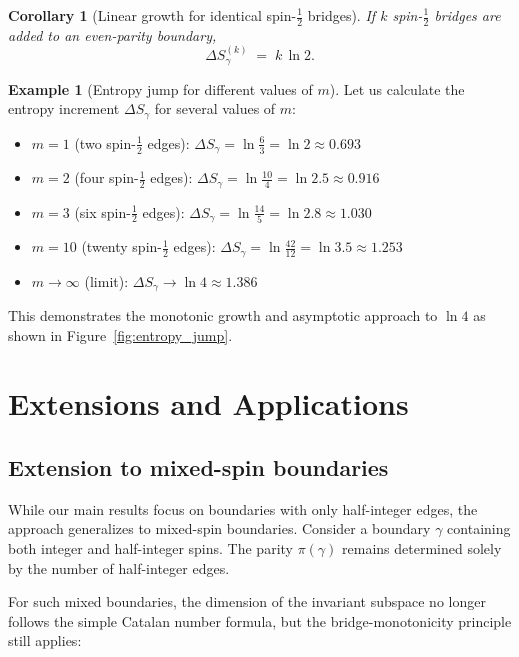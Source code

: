 \documentclass[11pt, a4paper]{article}
\theoremstyle{plain}
\newtheorem{corollary}[theorem]{Corollary}
\theoremstyle{definition}
\newtheorem{example}{Example}
\theoremstyle{remark}
\begin{document}
\begin{corollary}[Linear growth for identical spin-$\tfrac12$ bridges]
  \label{cor:linear}
  If $k$ spin-$\tfrac12$ bridges are added to an even-parity boundary,
  \[  \Delta S_{\gamma}^{(k)} \;=\; k\,\ln 2 .\]
\end{corollary}

\begin{example}[Entropy jump for different values of $m$]
  \label{ex:entropy_jumps}
  Let us calculate the entropy increment $\Delta S_{\gamma}$ for several values of $m$:

  \begin{itemize}
    \item $m=1$ (two spin-$\frac{1}{2}$ edges): $\Delta S_{\gamma} = \ln\frac{6}{3} = \ln 2 \approx 0.693$
    \item $m=2$ (four spin-$\frac{1}{2}$ edges): $\Delta S_{\gamma} = \ln\frac{10}{4} = \ln 2.5 \approx 0.916$
    \item $m=3$ (six spin-$\frac{1}{2}$ edges): $\Delta S_{\gamma} = \ln\frac{14}{5} = \ln 2.8 \approx 1.030$
    \item $m=10$ (twenty spin-$\frac{1}{2}$ edges): $\Delta S_{\gamma} = \ln\frac{42}{12} = \ln 3.5 \approx 1.253$
    \item $m \to \infty$ (limit): $\Delta S_{\gamma} \to \ln 4 \approx 1.386$
  \end{itemize}

  This demonstrates the monotonic growth and asymptotic approach to $\ln 4$ as shown in Figure~\ref{fig:entropy_jump}.
\end{example}

\section{Extensions and Applications}
\label{sec:extensions}

\subsection{Extension to mixed-spin boundaries}
\label{sec:mixed_spin}

While our main results focus on boundaries with only half-integer edges, the approach generalizes to mixed-spin boundaries. Consider a boundary $\gamma$ containing both integer and half-integer spins. The parity $\pi(\gamma)$ remains determined solely by the number of half-integer edges.

For such mixed boundaries, the dimension of the invariant subspace no longer follows the simple Catalan number formula, but the bridge-monotonicity principle still applies:
\end{document}
